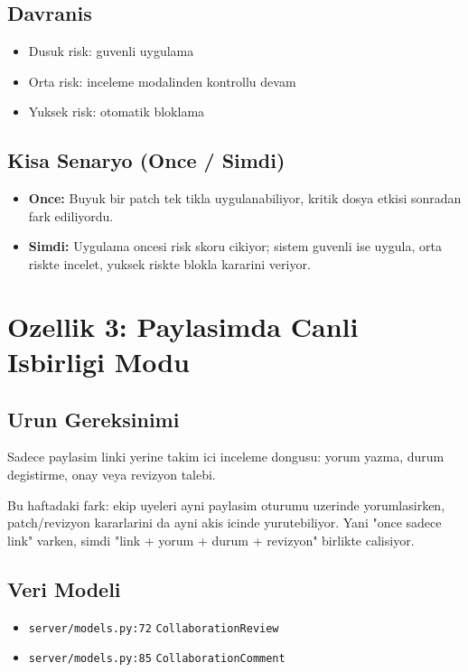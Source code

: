 \documentclass[12pt,a4paper]{article}
\begin{document}
\subsection{Davranis}
\begin{itemize}[leftmargin=*]
  \item Dusuk risk: guvenli uygulama
  \item Orta risk: inceleme modalinden kontrollu devam
  \item Yuksek risk: otomatik bloklama
\end{itemize}

\subsection{Kisa Senaryo (Once / Simdi)}
\begin{itemize}[leftmargin=*]
  \item \textbf{Once:} Buyuk bir patch tek tikla uygulanabiliyor,
  kritik dosya etkisi sonradan fark ediliyordu.
  \item \textbf{Simdi:} Uygulama oncesi risk skoru cikiyor; sistem
  guvenli ise uygula, orta riskte incelet, yuksek riskte blokla kararini veriyor.
\end{itemize}

\section{Ozellik 3: Paylasimda Canli Isbirligi Modu}
\subsection{Urun Gereksinimi}
Sadece paylasim linki yerine takim ici inceleme dongusu:
yorum yazma, durum degistirme, onay veya revizyon talebi.

Bu haftadaki fark: ekip uyeleri ayni paylasim oturumu uzerinde
yorumlasirken, patch/revizyon kararlarini da ayni akis icinde yurutebiliyor.
Yani "once sadece link" varken, simdi "link + yorum + durum + revizyon" birlikte calisiyor.

\subsection{Veri Modeli}
\begin{itemize}[leftmargin=*]
  \item \texttt{server/models.py:72} \texttt{CollaborationReview}
  \item \texttt{server/models.py:85} \texttt{CollaborationComment}
\end{itemize}
\end{document}
